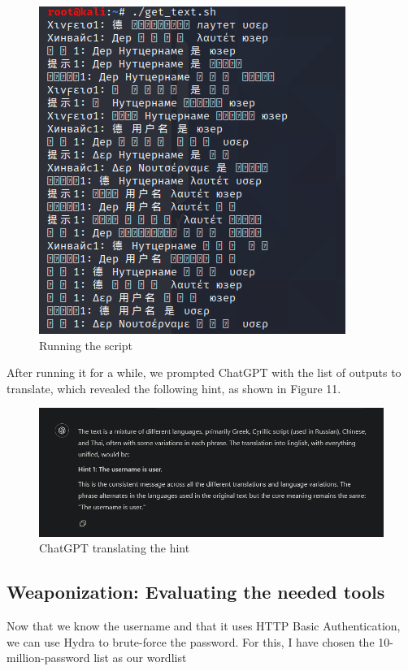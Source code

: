 \documentclass[a4paper]{article}
\newcommand{\abc}{\hfill \break}
\begin{document}
\begin{figure}[h]
	\includegraphics[scale=0.4]{images/gettextsh.png}
	\centering
	\caption{Running the script}
\end{figure}\abc
After running it for a while, we prompted ChatGPT with the list of outputs to translate, which revealed the following hint, as shown in Figure 11.
\begin{figure}[ht]
	\includegraphics[scale=0.4]{images/labngs.png}
	\centering
	\caption{ChatGPT translating the hint}
\end{figure}\abc
\subsection{Weaponization: Evaluating the needed tools}
Now that we know the username and that it uses HTTP Basic Authentication, we can use Hydra to brute-force the password. For this, I have chosen the 10-million-password list as our wordlist \cite{pw-list}
\end{document}
